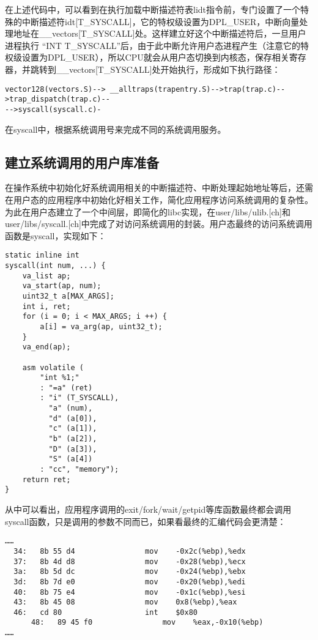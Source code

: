 在上述代码中，可以看到在执行加载中断描述符表lidt指令前，专门设置了一个特殊的中断描述符idt{[}T\_SYSCALL{]}，它的特权级设置为DPL\_USER，中断向量处理地址在\_\_vectors{[}T\_SYSCALL{]}处。这样建立好这个中断描述符后，一旦用户进程执行
``INT
T\_SYSCALL''后，由于此中断允许用户态进程产生（注意它的特权级设置为DPL\_USER），所以CPU就会从用户态切换到内核态，保存相关寄存器，并跳转到\_\_vectors{[}T\_SYSCALL{]}处开始执行，形成如下执行路径：

\begin{lstlisting}
vector128(vectors.S)--> __alltraps(trapentry.S)-->trap(trap.c)-->trap_dispatch(trap.c)--
-->syscall(syscall.c)-
\end{lstlisting}

在syscall中，根据系统调用号来完成不同的系统调用服务。

\subsection{建立系统调用的用户库准备}\label{ux5efaux7acbux7cfbux7edfux8c03ux7528ux7684ux7528ux6237ux5e93ux51c6ux5907}

在操作系统中初始化好系统调用相关的中断描述符、中断处理起始地址等后，还需在用户态的应用程序中初始化好相关工作，简化应用程序访问系统调用的复杂性。为此在用户态建立了一个中间层，即简化的libc实现，在user/libs/ulib.{[}ch{]}和user/libs/syscall.{[}ch{]}中完成了对访问系统调用的封装。用户态最终的访问系统调用函数是syscall，实现如下：

\begin{lstlisting}
static inline int
syscall(int num, ...) {
    va_list ap;
    va_start(ap, num);
    uint32_t a[MAX_ARGS];
    int i, ret;
    for (i = 0; i < MAX_ARGS; i ++) {
        a[i] = va_arg(ap, uint32_t);
    }
    va_end(ap);

    asm volatile (
        "int %1;"
        : "=a" (ret)
        : "i" (T_SYSCALL),
          "a" (num),
          "d" (a[0]),
          "c" (a[1]),
          "b" (a[2]),
          "D" (a[3]),
          "S" (a[4])
        : "cc", "memory");
    return ret;
}
\end{lstlisting}

从中可以看出，应用程序调用的exit/fork/wait/getpid等库函数最终都会调用syscall函数，只是调用的参数不同而已，如果看最终的汇编代码会更清楚：

\begin{lstlisting}
……
  34:   8b 55 d4                mov    -0x2c(%ebp),%edx
  37:   8b 4d d8                mov    -0x28(%ebp),%ecx
  3a:   8b 5d dc                mov    -0x24(%ebp),%ebx
  3d:   8b 7d e0                mov    -0x20(%ebp),%edi
  40:   8b 75 e4                mov    -0x1c(%ebp),%esi
  43:   8b 45 08                mov    0x8(%ebp),%eax
  46:   cd 80                   int    $0x80
      48:   89 45 f0                mov    %eax,-0x10(%ebp)
……
\end{lstlisting}

